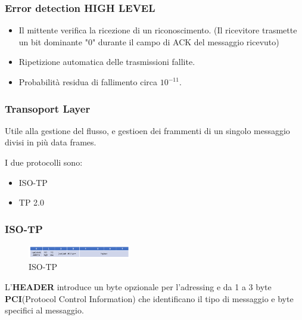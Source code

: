 \subsubsection{Error detection HIGH LEVEL}


\begin{itemize}
    \item Il mittente verifica la ricezione di un riconoscimento.
      (Il ricevitore trasmette un bit dominante "0" durante il campo di ACK del messaggio ricevuto)
    \item Ripetizione automatica delle trasmissioni fallite.
    \item Probabilità residua di fallimento circa $10^{-11}$.
\end{itemize}




\subsubsection{Transoport Layer}
Utile alla gestione del flusso, e gestioen dei frammenti di un singolo messaggio divisi in più data frames.

I due protocolli sono:
\begin{itemize}
  \item ISO-TP
  \item TP 2.0
\end{itemize}

\subsubsection{ISO-TP}
\begin{figure}[!ht]
  \centering
  \includegraphics[width=0.4\textwidth]{./images/can_iso_tp.png}
  \caption{ISO-TP}
  \label{fig:can_iso_tp}
\end{figure}


L'\textbf{HEADER} introduce un byte opzionale per l'adressing e da 1 a 3 byte \textbf{PCI}(Protocol Control Information) che identificano il tipo di messaggio e byte specifici al messaggio.


